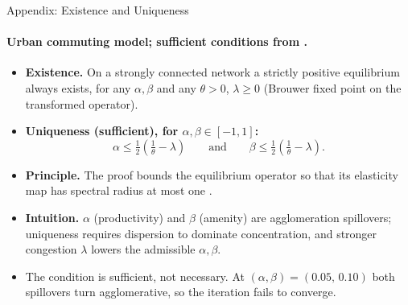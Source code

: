 \documentclass[11pt,aspectratio=169]{beamer}
\newcommand{\navback}[1]{\par\vspace{0.35em}\noindent\hfill\hyperlink{#1}{\beamerreturnbutton{back}}}
\begin{document}
\begin{frame}[label=appexist]{Appendix: Existence and Uniqueness}
\framesubtitle{Urban commuting model; sufficient conditions from \citet[Proposition~1]{allenarkolakis2022}.}
\small
\begin{itemize}
  \item \textbf{Existence.} On a strongly connected network a strictly positive equilibrium always exists, for any $\alpha,\beta$ and any $\theta>0$, $\lambda\ge0$ (Brouwer fixed point on the transformed operator).
  \item \textbf{Uniqueness (sufficient), for $\alpha,\beta\in[-1,1]$:}
  \vspace{-0.15em}\[
    \alpha\le\tfrac12\!\left(\tfrac1\theta-\lambda\right)
    \qquad\text{and}\qquad
    \beta\le\tfrac12\!\left(\tfrac1\theta-\lambda\right).
  \]
  \item \textbf{Principle.} The proof bounds the equilibrium operator so that its elasticity map has spectral radius at most one \citep{allenarkolakisli2020,karlin1967}.
  \item \textbf{Intuition.} $\alpha$ (productivity) and $\beta$ (amenity) are agglomeration spillovers; uniqueness requires dispersion to dominate concentration, and stronger congestion $\lambda$ lowers the admissible $\alpha,\beta$.
  \item The condition is sufficient, not necessary. At $(\alpha,\beta)=(0.05,\,0.10)$ both spillovers turn agglomerative, so the iteration fails to converge.
\end{itemize}
\navback{data}
\end{frame}

\end{document}
